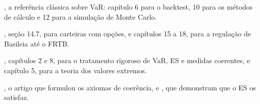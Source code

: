 \begin{leituras}
  \item \citet{jorion2007}, a referência clássica sobre VaR: capítulo 6 para o backtest, 10 para os métodos de cálculo e 12 para a simulação de Monte Carlo.
  \item \citet{hull2018}, seção 14.7, para carteiras com opções, e capítulos 15 a 18, para a regulação de Basileia até o FRTB.
  \item \citet{mcneil2015}, capítulos 2 e 8, para o tratamento rigoroso de VaR, ES e medidas coerentes, e capítulo 5, para a teoria dos valores extremos.
  \item \citet{artzner1999}, o artigo que formulou os axiomas de coerência, e \citet{acerbi2002}, que demonstram que o ES os satisfaz.
\end{leituras}
